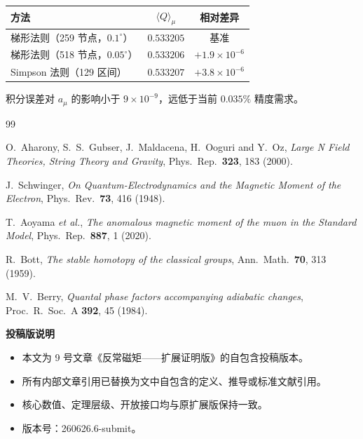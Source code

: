 \documentclass[12pt,a4paper]{article}
\theoremstyle{definition}
\begin{document}
\begin{center}
\begin{tabular}{@{}lcc@{}}
\toprule
方法 & $\langle Q\rangle_\mu$ & 相对差异 \\
\midrule
梯形法则（259 节点，$0.1^\circ$） & $0.533205$ & 基准 \\
梯形法则（518 节点，$0.05^\circ$） & $0.533206$ & $+1.9\times10^{-6}$ \\
Simpson 法则（129 区间） & $0.533207$ & $+3.8\times10^{-6}$ \\
\bottomrule
\end{tabular}
\end{center}

积分误差对 $a_\mu$ 的影响小于 $9\times10^{-9}$，远低于当前 $0.035\%$ 精度需求。

\begin{thebibliography}{99}

O.~Aharony, S.~S.~Gubser, J.~Maldacena, H.~Ooguri and Y.~Oz,
\textit{Large N Field Theories, String Theory and Gravity},
Phys.\ Rep.\ \textbf{323}, 183 (2000).

J.~Schwinger,
\textit{On Quantum-Electrodynamics and the Magnetic Moment of the Electron},
Phys.\ Rev.\ \textbf{73}, 416 (1948).

T.~Aoyama \textit{et al.},
\textit{The anomalous magnetic moment of the muon in the Standard Model},
Phys.\ Rep.\ \textbf{887}, 1 (2020).

R.~Bott,
\textit{The stable homotopy of the classical groups},
Ann.\ Math.\ \textbf{70}, 313 (1959).

M.~V.~Berry,
\textit{Quantal phase factors accompanying adiabatic changes},
Proc.\ R.\ Soc.\ A \textbf{392}, 45 (1984).

\end{thebibliography}

\vspace{1em}
\noindent\textbf{投稿版说明}
\begin{itemize}
\item 本文为 9 号文章《反常磁矩——扩展证明版》的自包含投稿版本。
\item 所有内部文章引用已替换为文中自包含的定义、推导或标准文献引用。
\item 核心数值、定理层级、开放接口均与原扩展版保持一致。
\item 版本号：260626.6-submit。
\end{itemize}
\end{document}
